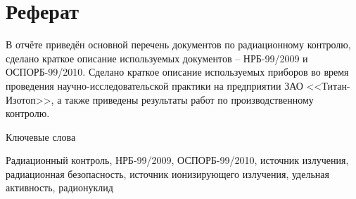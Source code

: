 \chapter*{Реферат}
	В отчёте приведён основной перечень документов по радиационному контролю, 
	сделано краткое описание используемых документов -- НРБ-99/2009 и 
	ОСПОРБ-99/2010. Сделано краткое описание используемых приборов во время 
	проведения научно-исследовательской практики на предприятии ЗАО 
	<<Титан-Изотоп>>, а также приведены результаты работ по производственному 
	контролю.

\begin{center}
	Ключевые слова \\
\end{center}

	Радиационный контроль, НРБ-99/2009, ОСПОРБ-99/2010, источник излучения, 
	радиационная безопасность, источник ионизирующего излучения, 
	удельная активность, радионуклид
	
\thispagestyle{empty}
\clearpage